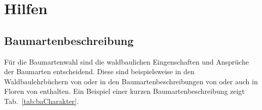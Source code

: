 \documentclass[twocolumn]{scrartcl}
\begin{document}
\section{Hilfen}
\label{sec:hilfen}

\subsection{Baumartenbeschreibung}
\label{sec:baBeschreibung}

Für die Baumartenwahl sind die waldbaulichen Eingenschaften und
Ansprüche der Baumarten entscheidend. Diese sind beispielsweise in den
Waldbaulehrbüchern von
\citet{mayer1992Waldbau,burschel2003Waldbau,Dengler2020Waldbau,tschermak1950Waldbau,rittershofer2006Waldbau,rubner1960Waldbau,koestler1950Waldbau,bauer1962WaldbauAlsWissenschaft}
oder in den Baumartenbeschreibungen von
\citet{eth2002MitteleuropaeischeWaldbaumarten,leibundgut1984Waldbaeume,ec2016baumartenatlas,hieke1989Dendrologie,mayr1906FremdlaendischeWaldUndParkbaeumeFuerEuropa,stimm2014EnyklopedieDerHolzgewaechse,schuett1993LexikonDerForstbotanik,fva2021Artensteckbrief,hempel1890BaeumeUStraeucher}
oder auch in Floren von
\citet{fischer2008Exkursionsflora,hegi1906IllustrierteFloraBd1,oberdorfer2001Exkursionsflora,rothmaler2021Exkursionsflora,schmeil2019Exkursionsflora,fitschen2017Gehoelzflora}
enthalten. Ein Beispiel einer kurzen Baumartenbeschreibung zeigt
Tab.~\ref{tab:baCharakter}.
\end{document}
